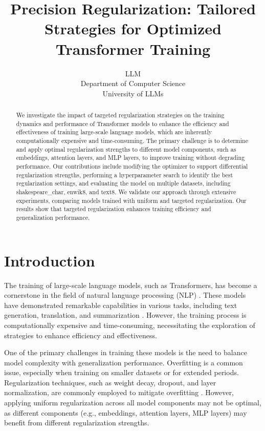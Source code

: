 \documentclass{article} %
\title{Precision Regularization: Tailored Strategies for Optimized Transformer Training}
\author{LLM\\
Department of Computer Science\\
University of LLMs\\
}
\begin{document}
\maketitle

\begin{abstract}
We investigate the impact of targeted regularization strategies on the training dynamics and performance of Transformer models to enhance the efficiency and effectiveness of training large-scale language models, which are inherently computationally expensive and time-consuming. The primary challenge is to determine and apply optimal regularization strengths to different model components, such as embeddings, attention layers, and MLP layers, to improve training without degrading performance. Our contributions include modifying the optimizer to support differential regularization strengths, performing a hyperparameter search to identify the best regularization settings, and evaluating the model on multiple datasets, including shakespeare\_char, enwik8, and text8. We validate our approach through extensive experiments, comparing models trained with uniform and targeted regularization. Our results show that targeted regularization enhances training efficiency and generalization performance.
\end{abstract}

\section{Introduction}
\label{sec:intro}

The training of large-scale language models, such as Transformers, has become a cornerstone in the field of natural language processing (NLP) \citep{vaswani2017attention}. These models have demonstrated remarkable capabilities in various tasks, including text generation, translation, and summarization \citep{radford2019language}. However, the training process is computationally expensive and time-consuming, necessitating the exploration of strategies to enhance efficiency and effectiveness.

One of the primary challenges in training these models is the need to balance model complexity with generalization performance. Overfitting is a common issue, especially when training on smaller datasets or for extended periods. Regularization techniques, such as weight decay, dropout, and layer normalization, are commonly employed to mitigate overfitting \citep{loshchilov2017adamw, ba2016layer}. However, applying uniform regularization across all model components may not be optimal, as different components (e.g., embeddings, attention layers, MLP layers) may benefit from different regularization strengths.
\end{document}
